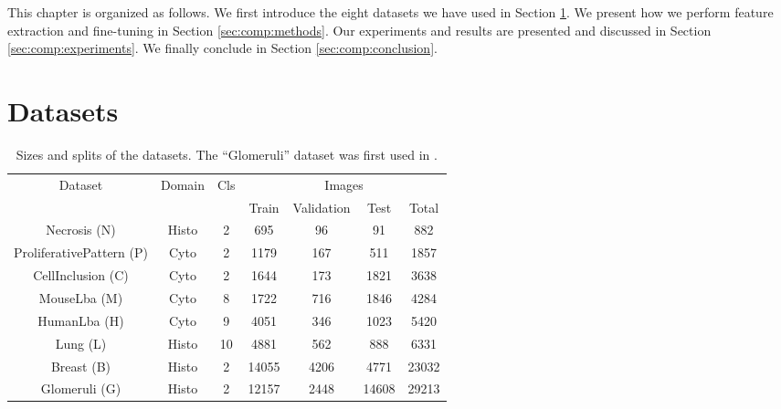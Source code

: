 This chapter is organized as follows. We first introduce the eight datasets we have used in Section \ref{sec:comp:datasets}. We present how we perform feature extraction and fine-tuning in Section \ref{sec:comp:methods}. Our experiments and results are presented and discussed in Section \ref{sec:comp:experiments}. We finally conclude in Section \ref{sec:comp:conclusion}. 

\section{Datasets}
\label{sec:comp:datasets}

\begin{table}
    \center 
    \small
    \begin{tabular}{|c|c|c||ccc|c|}
        \hline
        \multirow{2}{*}{Dataset} & \multirow{2}{*}{Domain} & \multirow{2}{*}{Cls} & \multicolumn{4}{c|}{Images} \\
        \cline{4-7}
        & & & Train & Validation & Test & Total \\
        \hline
        Necrosis (N) & Histo & 2 & 695 & 96 & 91 & 882 \\ %
        ProliferativePattern (P) & Cyto & 2 & 1179 & 167 & 511 & 1857 \\ %
        CellInclusion (C) & Cyto & 2 & 1644 & 173 & 1821 & 3638 \\ %
        MouseLba  (M) & Cyto & 8 & 1722 & 716 & 1846 & 4284 \\ %
        HumanLba (H) & Cyto & 9 & 4051 & 346 & 1023 & 5420 \\ %
        Lung (L) & Histo & 10 & 4881 & 562 & 888 & 6331 \\ %
        Breast (B) & Histo & 2 & 14055 & 4206 & 4771 & 23032 \\ %
        Glomeruli (G) & Histo & 2  & 12157 & 2448 & 14608 & 29213 \\ %
        \hline
    \end{tabular}
    \caption{Sizes and splits of the datasets. The ``Glomeruli'' dataset was first used in \parencite{maree2016approach}.}
    \label{tab:comp:dataset_information}
\end{table}

